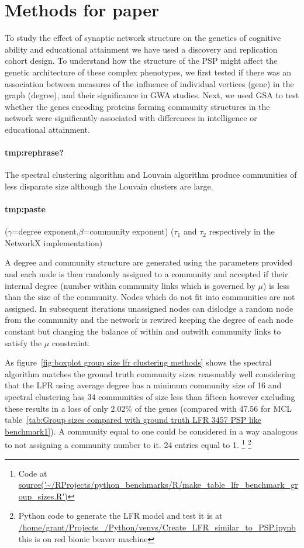 \section{Methods for paper}
\label{sec: community detection methods from paper}
To study the effect of synaptic network structure on the genetics of cognitive ability and educational attainment we have used a discovery and replication cohort design. To understand how the structure of the PSP might affect the genetic architecture of these complex phenotypes, we first tested if there was an association between measures of the influence of individual vertices (gene) in the graph (degree), and their significance in GWA studies. 
Next, we used GSA to test whether the genes encoding proteins forming community structures in the network were significantly associated with differences in intelligence or educational attainment. 

\paragraph{tmp:rephrase?}
The spectral clustering algorithm and Louvain algorithm produce communities of less disparate size although the Louvain clusters are large. 


\paragraph{tmp:paste}
($\gamma$=degree exponent,$\beta$=community exponent)
($\tau_1$ and $\tau_2$ respectively in the NetworkX implementation\cite{hagberg2008exploring})

A degree and community structure are generated using the parameters provided and each node is then randomly assigned to a community and accepted if their internal degree (number within community links which is governed by $\mu$) is less than the size of the community. Nodes which do not fit into communities are not assigned. In subsequent iterations unassigned nodes can dislodge a random node from the community and the network is rewired keeping the degree of each node constant but changing the balance of within and outwith community links to satisfy the $\mu$ constraint. 


As figure~\ref{fig:boxplot group size lfr clustering methods} shows the spectral algorithm matches the ground truth community sizes reasonably well considering that the LFR using average degree has a minimum community size of 16 and spectral clustering has 34 communities of size less than fifteen however excluding these results in a loss of only 2.02\% of the genes (compared with 47.56 for MCL table~\ref{tab:Group sizes compared with ground truth LFR 3457 PSP like benchmark1}). A community equal to one could be considered in a way analogous to not assigning a community number to it. 24 entries equal to 1. \footnote{Code at \url{source('~/RProjects/python_benchmarks/R/make_table_lfr_benchmark_group_sizes.R')}}
\footnote{Python code to generate the LFR model and test it is at \url{/home/grant/Projects_/Python/venvs/Create_LFR_similar_to_PSP.ipynb} this is on red bionic beaver machine}

